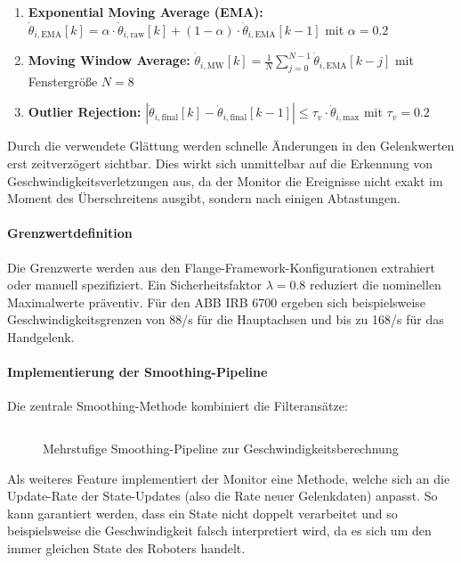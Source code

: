 \begin{enumerate}
	\item \textbf{Exponential Moving Average (EMA):}
	      $\dot{\theta}_{i,\text{EMA}}[k] = \alpha \cdot \dot{\theta}_{i,\text{raw}}[k] + (1-\alpha) \cdot \dot{\theta}_{i,\text{EMA}}[k-1]$ mit $\alpha = 0.2$

	\item \textbf{Moving Window Average:}
	      $\dot{\theta}_{i,\text{MW}}[k] = \frac{1}{N} \sum_{j=0}^{N-1} \dot{\theta}_{i,\text{EMA}}[k-j]$ mit Fenstergröße $N = 8$

	\item \textbf{Outlier Rejection:}
	      $|\dot{\theta}_{i,\text{final}}[k] - \dot{\theta}_{i,\text{final}}[k-1]| \leq \tau_v \cdot \dot{\theta}_{i,\text{max}}$ mit $\tau_v = 0.2$
\end{enumerate}
\noindent
Durch die verwendete Glättung werden schnelle Änderungen in den Gelenkwerten
erst zeitverzögert sichtbar. Dies wirkt sich unmittelbar auf die Erkennung von
Geschwindigkeitsverletzungen aus, da der Monitor die Ereignisse nicht exakt im
Moment des Überschreitens ausgibt, sondern nach einigen Abtastungen.

\paragraph{Grenzwertdefinition} Die Grenzwerte werden aus den
Flange-Framework-Konfigurationen extrahiert oder manuell spezifiziert. Ein
Sicherheitsfaktor $\lambda = 0.8$ reduziert die nominellen Maximalwerte
präventiv. Für den ABB IRB 6700 ergeben sich beispielsweise
Geschwindigkeitsgrenzen von 88\textdegree/s für die Hauptachsen und bis zu 168\textdegree/s für das
Handgelenk.

\paragraph{Implementierung der Smoothing-Pipeline}
Die zentrale Smoothing-Methode kombiniert die Filteransätze:

\begin{figure}[H]
	\inputminted[fontsize=\footnotesize]{csharp}{code-snippets/SmoothVelocities.cs}
	\caption{Mehrstufige Smoothing-Pipeline zur Geschwindigkeitsberechnung}
	\label{listing:smoothing_pipeline}
\end{figure}

\noindent
Als weiteres Feature implementiert der Monitor eine Methode, welche sich an die
Update-Rate der State-Updates (also die Rate neuer Gelenkdaten) anpasst. So kann
garantiert werden, dass ein State nicht doppelt verarbeitet und so
beispielsweise die Geschwindigkeit falsch interpretiert wird, da es sich um den
immer gleichen State des Roboters handelt.\\

